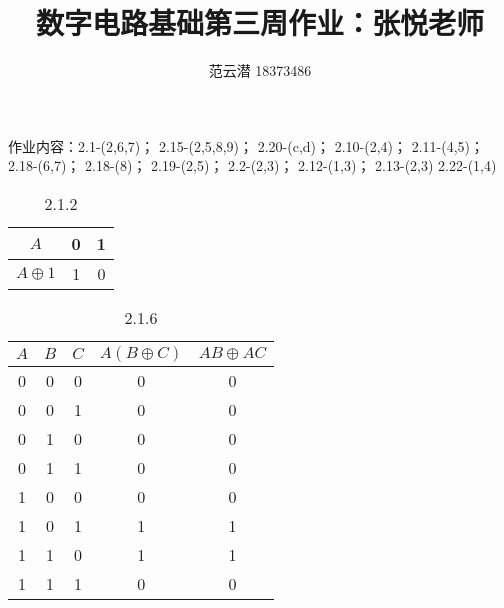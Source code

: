 \documentclass[lang=cn,11pt,a4paper,cite=authoryear,twocolumn]{elegantpaper}
\title{数字电路基础\quad 第三周作业：张悦老师}
\author{范云潜 18373486}
\institute{微电子学院 184111 班}
\date{\zhtoday}
\begin{document}
\maketitle

作业内容：2.1-(2,6,7)；
2.15-(2,5,8,9)；
2.20-(c,d)；
2.10-(2,4)；
2.11-(4,5)；
2.18-(6,7)；
2.18-(8)；
2.19-(2,5)；
2.2-(2,3)；
2.12-(1,3)；
2.13-(2,3)
2.22-(1,4)




\begin{table}[htb]
    \centering
    \caption{2.1.2}
    \label{tab:my-table}
    \begin{tabular}{ccc}
        \hline
        \(A\)         & 0 & 1 \\ \hline
        \(A\oplus 1\) & 1 & 0 \\
                    \hline
    \end{tabular}
\end{table}


\begin{table}[htb]
    \centering
    \caption{2.1.6}
    \label{tab:my-table}
    \begin{tabular}{ccccc}
    \hline
    \(A\) & \(B\) & \(C\) & \(A(B\oplus C)\) & \(AB\oplus AC\) \\ \hline
    0     & 0     & 0     & 0                & 0               \\
    0     & 0     & 1     & 0                & 0               \\
    0     & 1     & 0     & 0                & 0               \\
    0     & 1     & 1     & 0                & 0               \\
    1     & 0     & 0     & 0                & 0               \\
    1     & 0     & 1     & 1                & 1               \\
    1     & 1     & 0     & 1                & 1               \\
    1     & 1     & 1     & 0                & 0               \\ \hline
    \end{tabular}
\end{table}
\end{document}
